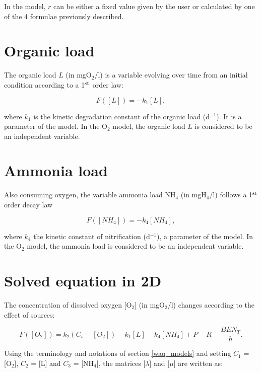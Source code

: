 In the model, $r$ can be either a fixed value given by the user or
calculated by one of the 4 formulae previously described.\\

\section{Organic load}

The organic load $L$ (in mgO$_2$/l) is a variable evolving over time
from an initial condition according to a 1$^{\rm{st}}$ order law:

\begin{equation}
  F([L]) = -k_1 [L],
\end{equation}

where $k_1$ is the kinetic degradation constant of the organic load (d$^{-1}$).
It is a parameter of the model.
In the O$_2$ model, the organic load $L$ is considered to be an independent variable.

\section{Ammonia load}

Also consuming oxygen, the variable ammonia load NH$_4$ (in mgH$_4$/l) follows
a 1$^{\rm{st}}$ order decay law

\begin{equation}
  F([NH_4]) = -k_4 [NH_4],
\end{equation}

where $k_4$ the kinetic constant of nitrification (d$^{-1}$),
a parameter of the model.
In the O$_2$ model, the ammonia load is considered to be an independent variable.\\

\section{Solved equation in 2D}

The concentration of dissolved oxygen [O$_2$] (in mgO$_2$/l) changes
according to the effect of sources:

\begin{equation}
  F([O_2]) = k_2 (C_s - [O_2]) -k_1 [L] - k_4 [NH_4] + P - R - \frac{BEN_T}{h}.
\end{equation}

Using the terminology and notations of section \ref{waq_models}
and setting $C_1$ = [O$_2$], $C_2$ = [L] and $C_3$ = [NH$_4$],
the matrices [$ \lambda $] and [$ \mu $]
are written as:\\

